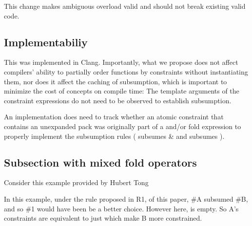 \documentclass{wg21}
\begin{document}
This change makes ambiguous overload valid and should not break existing valid code.

\subsection{Implementabiliy}

This was implemented in Clang.
Importantly, what we propose does not affect compilers' ability to partially order functions by constraints without instantiating them, nor does it affect
the caching of subsumption, which is important to minimize the cost of concepts on compile time: The template arguments of the constraint expressions do not need to be observed
to establish subsumption.

An implementation does need to track whether an atomic constraint that contains an unexpanded pack was originally part of a and/or fold expression to properly
implement the subsumption rules (\tcode{\&\&} subsumes \tcode{||} \& \tcode{\&\&} and \tcode{||} subsumes \tcode{||}).

\subsection{Subsection with mixed fold operators}

Consider this example provided by Hubert Tong


In this example, under the rule proposed in R1, of this paper, \#A subsumed \#B, and so \#1 would have been be a better choice.
However here,  is empty. So A's constraints are equivalent to just  which make B more constrained.
\end{document}
